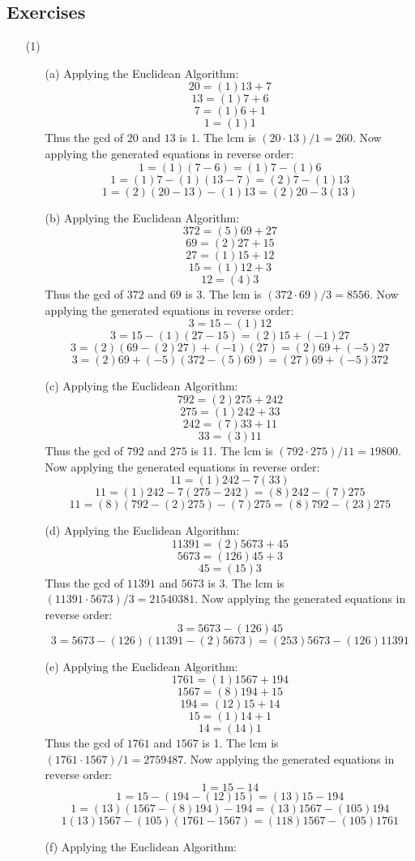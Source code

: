 \documentclass[12pt]{article}
\begin{document}
\subsection*{Exercises}
\begin{itemize}
\item[(1)]
\begin{itemize}
\item[(a)]Applying the Euclidean Algorithm:
$$20 = (1)13 + 7$$
$$13 = (1)7 + 6$$
$$7 = (1)6 + 1$$
$$1 = (1)1$$
Thus the gcd of $20$ and $13$ is 1. The lcm is $(20 \cdot 13) / 1 = 260$. Now applying the generated equations in reverse order:
$$1 = (1)(7 - 6) = (1)7 - (1)6$$
$$1 = (1)7 - (1)(13 - 7) = (2)7 - (1)13$$
$$1 = (2)(20 - 13) - (1)13 = (2)20 - 3(13)$$
\item[(b)] Applying the Euclidean Algorithm:
$$372 = (5)69 + 27$$
$$69 = (2)27 + 15$$
$$27 = (1)15 + 12$$
$$15 = (1)12 + 3$$
$$12 = (4)3$$
Thus the gcd of $372$ and $69$ is 3. The lcm is $(372 \cdot 69) / 3 = 8556$. Now applying the generated equations in reverse order:
$$3 = 15 - (1)12$$
$$3 = 15 - (1)(27 - 15) = (2)15 + (-1)27$$
$$3 = (2)(69 - (2)27) + (-1)(27) = (2)69 + (-5)27$$
$$3 = (2)69 + (-5)(372 - (5)69) = (27)69 + (-5)372$$
\item[(c)] Applying the Euclidean Algorithm:
$$792 = (2)275 + 242$$
$$275 = (1)242 + 33$$
$$242 = (7)33 + 11$$
$$33 = (3)11$$
Thus the gcd of $792$ and $275$ is 11. The lcm is $(792 \cdot 275) / 11 = 19800$. Now applying the generated equations in reverse order:
$$11 = (1)242 - 7(33)$$
$$11 = (1)242 - 7(275 - 242) = (8)242 - (7)275$$
$$11 = (8)(792 - (2)275) - (7)275 = (8)792 - (23)275$$
\item[(d)] Applying the Euclidean Algorithm:
$$11391 = (2)5673 + 45$$
$$5673 = (126)45 + 3$$
$$45 = (15)3$$
Thus the gcd of $11391$ and $5673$ is 3. The lcm is $(11391 \cdot 5673) / 3 = 21540381$. Now applying the generated equations in reverse order:
$$3 = 5673 - (126)45$$
$$3 = 5673 - (126)(11391 - (2)5673) = (253)5673 - (126)11391$$
\item[(e)] Applying the Euclidean Algorithm:
$$1761 = (1)1567 + 194$$
$$1567 = (8)194 + 15$$
$$194 = (12)15 + 14$$
$$15 = (1)14 + 1$$
$$14 = (14)1$$
Thus the gcd of $1761$ and $1567$ is 1. The lcm is $(1761 \cdot 1567) / 1 = 2759487$. Now applying the generated equations in reverse order:
$$1 = 15 - 14$$
$$1 = 15 - (194 - (12)15) = (13)15 - 194$$
$$1 = (13)(1567 - (8)194) - 194 = (13)1567 - (105)194$$
$$1  (13)1567 - (105)(1761 - 1567) = (118)1567 - (105)1761$$
\item[(f)] Applying the Euclidean Algorithm:

\end{itemize}
\end{itemize}
\end{document}
